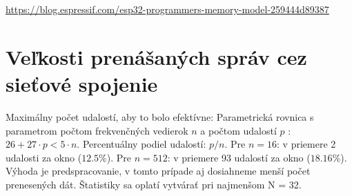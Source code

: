\url{https://blog.espressif.com/esp32-programmers-memory-model-259444d89387}

\section{Veľkosti prenášaných správ cez sieťové spojenie}

Maximálny počet udalostí, aby to bolo efektívne: Parametrická rovnica s parametrom počtom frekvenčných vedierok $n$ 
a počtom udalostí $p$ : $26 + 27 \cdot p < 5 \cdot n$. Percentuálny podiel udalostí: $p / n$. Pre $n = 16$: v priemere 
2 udalosti za okno ($12.5\%$). Pre $n = 512$: v priemere 93 udalostí za okno ($18.16\%$). Výhoda je predspracovanie, 
v tomto prípade aj dosiahneme menší počet prenesených dát. Štatistiky sa oplatí vytvárať pri najmenšom N = 32.

